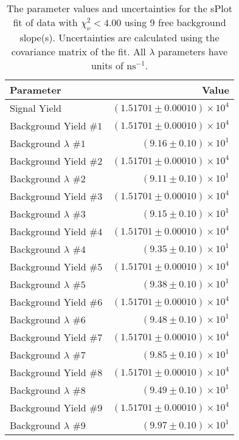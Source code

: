 
\begin{table}
    \begin{center}
        \begin{tabular}{lr}\toprule
            Parameter & Value \\\midrule
            Signal Yield & $(1.51701 \pm 0.00010) \times 10^{4}$ \\
            Background Yield $\#1$ & $(1.51701 \pm 0.00010) \times 10^{4}$ \\
            Background $\lambda$ $\#1$ & $(9.16 \pm 0.10) \times 10^{1}$ \\
            Background Yield $\#2$ & $(1.51701 \pm 0.00010) \times 10^{4}$ \\
            Background $\lambda$ $\#2$ & $(9.11 \pm 0.10) \times 10^{1}$ \\
            Background Yield $\#3$ & $(1.51701 \pm 0.00010) \times 10^{4}$ \\
            Background $\lambda$ $\#3$ & $(9.15 \pm 0.10) \times 10^{1}$ \\
            Background Yield $\#4$ & $(1.51701 \pm 0.00010) \times 10^{4}$ \\
            Background $\lambda$ $\#4$ & $(9.35 \pm 0.10) \times 10^{1}$ \\
            Background Yield $\#5$ & $(1.51701 \pm 0.00010) \times 10^{4}$ \\
            Background $\lambda$ $\#5$ & $(9.38 \pm 0.10) \times 10^{1}$ \\
            Background Yield $\#6$ & $(1.51701 \pm 0.00010) \times 10^{4}$ \\
            Background $\lambda$ $\#6$ & $(9.48 \pm 0.10) \times 10^{1}$ \\
            Background Yield $\#7$ & $(1.51701 \pm 0.00010) \times 10^{4}$ \\
            Background $\lambda$ $\#7$ & $(9.85 \pm 0.10) \times 10^{1}$ \\
            Background Yield $\#8$ & $(1.51701 \pm 0.00010) \times 10^{4}$ \\
            Background $\lambda$ $\#8$ & $(9.49 \pm 0.10) \times 10^{1}$ \\
            Background Yield $\#9$ & $(1.51701 \pm 0.00010) \times 10^{4}$ \\
            Background $\lambda$ $\#9$ & $(9.97 \pm 0.10) \times 10^{1}$ \\\bottomrule
        \end{tabular}
        \caption{The parameter values and uncertainties for the sPlot fit of data with $\chi^2_\nu < 4.00$ using 9 free background slope(s). Uncertainties are calculated using the covariance matrix of the fit. All $\lambda$ parameters have units of $\si{\nano\second}^{-1}$.}
    \end{center}
\end{table}
